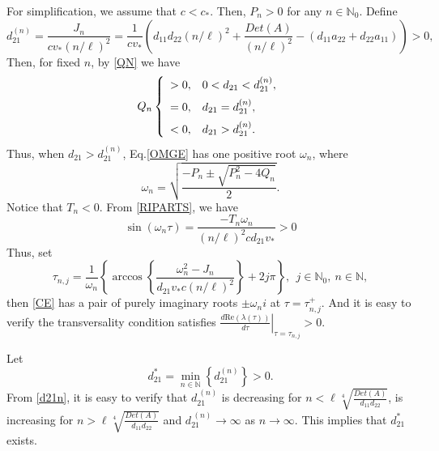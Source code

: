 \documentclass[11pt]{article}
\theoremstyle{definition}
\theoremstyle{remark}
\numberwithin{equation}{section}
\begin{document}
For simplification, we assume that $c<c_*$. Then, $P_n>0$ for any $n\in\mathbb{N}_0$.
Define
\begin{equation}
\label{d21n}
d_{21}^{(n)}  =\frac{J_n}{cv_*(n/\ell)^2}=\frac{1}{cv_*}\left( d_{11}d_{22} (n/\ell)^2 +\frac{Det(A)}{(n/\ell)^2}-\left( d_{11}a_{22}+d_{22}a_{11} \right)\right)>0,
\end{equation}
Then, for fixed $n$,  by \eqref{QN} we have
\begin{equation}
\label{QN1}
 Q_n\left\{
 \begin{array}{ll}
 >0, & 0<d_{21}<d_{21}^{(n)},   \vspace{0.2cm}\\
  =0, & d_{21}=d_{21}^{(n)},  \vspace{0.2cm}\\
  <0, & d_{21}>d_{21}^{(n)}.
 \end{array}
 \right.
\end{equation}
Thus, when $d_{21}>d_{21}^{(n)}$, Eq.\eqref{OMGE} has one positive root  $\omega_n$, where
\begin{equation}
\label{OMGN}
\omega_n =\sqrt{\frac{-P_n\pm \sqrt{P_n^2-4Q_n}}{2}}.
\end{equation}
Notice that $T_n<0$. From \eqref{RIPARTS}, we have
$$\sin\left(\omega_n\tau\right)=\frac{-T_n\omega_n}{(n/\ell)^2cd_{21}v_*}>0$$
Thus, set
\begin{equation}
\label{TAUNJ}
\tau_{n, j}=\frac{1}{\omega_n}\left\{\arccos \left\{\frac{\omega_n^2-J_n}{d_{21}v_*c(n/\ell)^2}\right\}+2j\pi\right\}, ~~j\in\mathbb{N}_0,~n\in\mathbb{N},
\end{equation}
 then \eqref{CE} has a pair of purely imaginary roots $\pm \omega_ni$ at $\tau=\tau_{n, j}^+$.  And it is easy to verify
the  transversality condition satisfies
 $\left.\frac{d \mathrm{Re}(\lambda (\tau))}{d
\tau}\right|_{\tau=\tau_{n,j}}>0$.

Let
 \begin{equation}
\label{D21STAR}
d_{21}^{*}=\min\limits_{n\in \mathbb{N}}\left\{ d_{21}^{(n)} \right\}>0.
\end{equation}
From \eqref{d21n}, it is easy to verify that $d_{21}^{~\left(n\right)}$ is decreasing for $n<\ell \sqrt[4]{\frac{Det(A)}{d_{11}d_{22}} }$, is increasing for $n>\ell\sqrt[4]{\frac{Det(A)}{d_{11}d_{22}} }$ and $d_{21}^{~\left(n\right)}\to\infty$ as $n\to\infty$.   This implies that
   $d_{21}^{*}$ exists.
\end{document}
